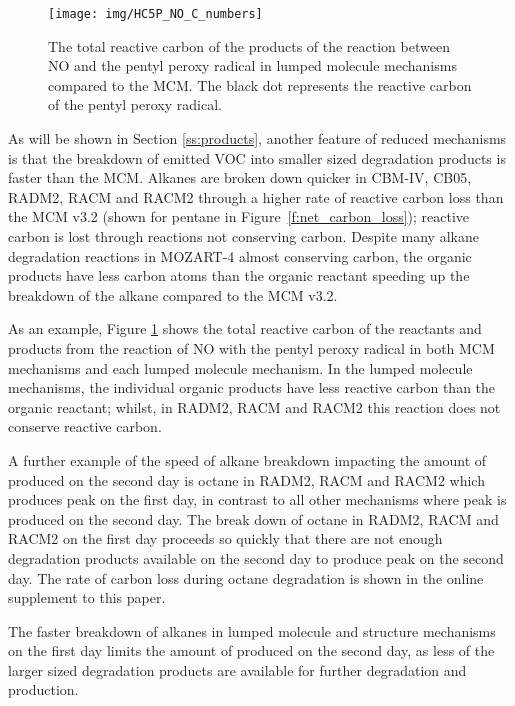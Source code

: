 %
\begin{figure}
    \centering
    \texttt{[image: img/HC5P\_NO\_C\_numbers]}
    \vspace{1mm}
    \caption{The total reactive carbon of the products of the reaction between NO and the pentyl peroxy radical in lumped molecule mechanisms compared to the MCM. The black dot represents the reactive carbon of the pentyl peroxy radical.}
    \label{f:HC5P_NO}
    \vspace{-4mm}
\end{figure}
%
As will be shown in Section \ref{ss:products}, another feature of reduced mechanisms is that the breakdown of emitted VOC into smaller sized degradation products is faster than the MCM.
Alkanes are broken down quicker in CBM-IV, CB05, RADM2, RACM and RACM2 through a higher rate of reactive carbon loss than the MCM v3.2 (shown for pentane in \mbox{Figure \ref{f:net_carbon_loss}}); reactive carbon is lost through reactions not conserving carbon.
Despite many alkane degradation reactions in MOZART-4 almost conserving carbon, the organic products have less carbon atoms than the organic reactant speeding up the breakdown of the alkane compared to the MCM v3.2.

As an example, Figure \ref{f:HC5P_NO} shows the total reactive carbon of the reactants and products from the reaction of NO with the pentyl peroxy radical in both MCM mechanisms and each lumped molecule mechanism.
In the lumped molecule mechanisms, the individual organic products have less reactive carbon than the organic reactant; whilst, in RADM2, RACM and RACM2 this reaction does not conserve reactive carbon.  

A further example of the speed of alkane breakdown impacting the amount of  produced on the second day is octane in RADM2, RACM and RACM2 which produces peak  on the first day, in contrast to all other mechanisms where peak  is produced on the second day.
The break down of octane in RADM2, RACM and RACM2 on the first day proceeds so quickly that there are not enough degradation products available on the second day to produce peak  on the second day.
The rate of carbon loss during octane degradation is shown in the online supplement to this paper.

The faster breakdown of alkanes in lumped molecule and structure mechanisms on the first day limits the amount of  produced on the second day, as less of the larger sized degradation products are available for further degradation and  production.  
%
